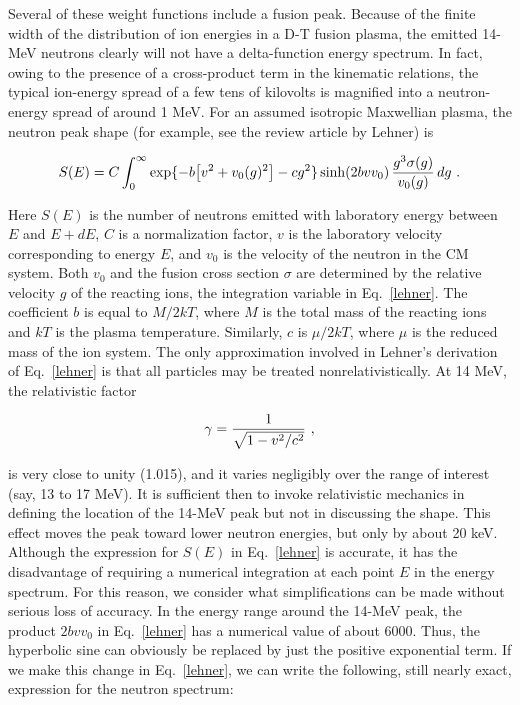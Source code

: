 Several of these weight functions include a fusion peak.
Because of the finite width of the distribution of ion
energies in a D-T fusion plasma, the emitted 14-MeV
neutrons clearly will not have a delta-function energy
spectrum.  In fact, owing to the presence of a cross-product
term in the kinematic relations, the typical ion-energy
spread of a few tens of kilovolts is magnified into a
neutron-energy spread of around 1 MeV.
For an assumed isotropic Maxwellian plasma, the neutron peak
shape (for example, see the review article by Lehner\cite{one}) is

\begin{equation}
  S(E)=C\int_0^\infty \exp\{-b\bigl[v^2+v_0(g)^2\bigr]-cg^2\}
  \sinh(2bvv_0)\,{{g^3\sigma(g)}\over{v_0(g)}}\,dg \,\,.
\label{lehner}
\end{equation}

\noindent
Here $S(E)$ is the number of neutrons emitted with laboratory
energy between $E$ and $E+dE$, $C$ is a normalization
factor, $v$ is the laboratory velocity corresponding to
energy $E$, and $v_0$ is the velocity of the neutron in
the CM system.  Both $v_0$ and the fusion cross section
$\sigma$ are determined by the relative velocity $g$ of
the reacting ions, the integration variable in Eq.~\ref{lehner}.
The coefficient $b$ is equal to $M/2kT$, where $M$ is the
total mass of the reacting ions and $kT$ is the plasma
temperature.  Similarly, $c$ is $\mu /2kT$, where $\mu$
is the reduced mass of the ion system.
The only approximation involved in Lehner's derivation
of Eq.~\ref{lehner} is that all particles may be treated
nonrelativistically.  At 14 MeV, the relativistic factor

\begin{equation}
  \gamma={{1}\over{\sqrt{1-v^2/c^2}}}\,\,,
\end{equation}

\noindent
is very close to unity (1.015), and it varies negligibly over
the range of interest (say, 13 to 17 MeV).  It is sufficient
then to invoke relativistic mechanics in defining the location
of the 14-MeV peak but not in discussing the shape.  This
effect  moves the peak toward lower neutron energies, but
only by about 20 keV.  Although the expression for $S(E)$
in Eq.~\ref{lehner} is accurate, it has the disadvantage of
requiring a numerical integration at each point $E$ in the
energy spectrum.  For this reason, we consider what
simplifications can be made without serious loss
of accuracy.  In the energy range around the 14-MeV peak, the
product $2bvv_0$ in Eq.~\ref{lehner} has a numerical value of
about 6000.  Thus, the hyperbolic sine can obviously be replaced
by just the positive exponential term.  If we make this change in
Eq.~\ref{lehner}, we can write the following, still nearly exact,
expression for the neutron spectrum:

